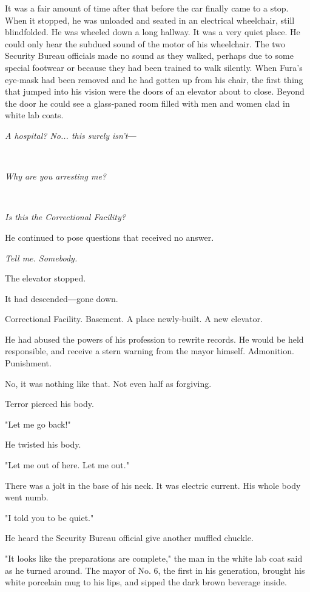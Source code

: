 It was a fair amount of time after that before the car finally came to a
stop. When it stopped, he was unloaded and seated in an electrical
wheelchair, still blindfolded. He was wheeled down a long hallway. It
was a very quiet place. He could only hear the subdued sound of the
motor of his wheelchair. The two Security Bureau officials made no sound
as they walked, perhaps due to some special footwear or because they had
been trained to walk silently. When Fura's eye-mask had been removed and
he had gotten up from his chair, the first thing that jumped into his
vision were the doors of an elevator about to close. Beyond the door he
could see a glass-paned room filled with men and women clad in white lab
coats.

\emph{A hospital? No... this surely isn't―}

\emph{\\
}

\emph{Why are you arresting me?}

\emph{\\
}

\emph{Is this the Correctional Facility?}

He continued to pose questions that received no answer.

\emph{Tell me. Somebody.}

The elevator stopped.

It had descended―gone down.

Correctional Facility. Basement. A place newly-built. A new elevator.~

He had abused the powers of his profession to rewrite records. He would
be held responsible, and receive a stern warning from the mayor himself.
Admonition. Punishment.

No, it was nothing like that. Not even half as forgiving.

Terror pierced his body.

"Let me go back!"

He twisted his body.

"Let me out of here. Let me out."

There was a jolt in the base of his neck. It was electric current. His
whole body went numb.

"I told you to be quiet."

He heard the Security Bureau official give another muffled chuckle.

"It looks like the preparations are complete," the man in the white lab
coat said as he turned around. The mayor of No. 6, the first in his
generation, brought his white porcelain mug to his lips, and sipped the
dark brown beverage inside.

